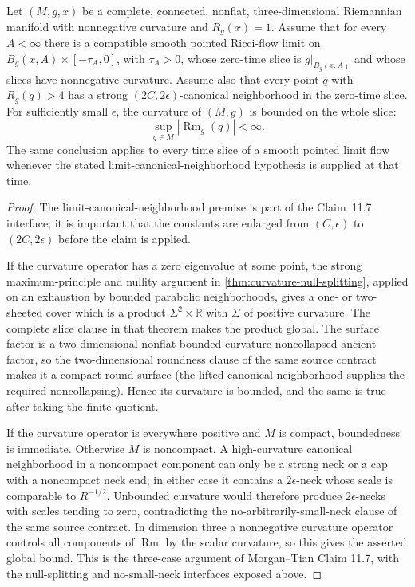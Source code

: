 \begin{lemma}
\label{lem:blowup-limit-slice-bounded-curvature}
\notready
Let $(M,g,x)$ be a complete, connected, nonflat, three-dimensional
Riemannian manifold with nonnegative curvature and $R_g(x)=1$.  Assume that
for every $A<\infty$ there is a compatible smooth pointed Ricci-flow limit on
$B_g(x,A)\times[-\tau_A,0]$, with $\tau_A>0$, whose zero-time slice is
$g|_{B_g(x,A)}$ and whose slices have nonnegative curvature.  Assume also
that every point $q$ with $R_g(q)>4$ has a strong $(2C,2\epsilon)$-canonical
neighborhood in the zero-time slice.  For sufficiently small $\epsilon$, the
curvature of $(M,g)$ is bounded on the whole slice:
\[
 \sup_{q\in M}|\operatorname{Rm}_g(q)|<\infty.
\]
The same conclusion applies to every time slice of a smooth pointed limit
flow whenever the stated limit-canonical-neighborhood hypothesis is supplied
at that time.
\end{lemma}

\begin{proof}
The limit-canonical-neighborhood premise is part of the Claim~11.7
interface; it is important that the constants are enlarged from
$(C,\epsilon)$ to $(2C,2\epsilon)$ before the claim is applied.

If the curvature operator has a zero eigenvalue at some point, the strong
maximum-principle and nullity argument in
\ref{thm:curvature-null-splitting}, applied on an exhaustion by bounded
parabolic neighborhoods, gives a one- or two-sheeted cover which is a product
$\Sigma^2\times\mathbb R$ with $\Sigma$ of positive curvature.  The complete
slice clause in that theorem makes the product global.  The surface factor is
a two-dimensional nonflat bounded-curvature noncollapsed ancient factor, so
the two-dimensional roundness clause of the same source contract makes it a
compact round surface (the lifted canonical neighborhood supplies the
required noncollapsing).  Hence its curvature is bounded, and the same is
true after taking the finite quotient.

If the curvature operator is everywhere positive and $M$ is compact, boundedness
is immediate.  Otherwise $M$ is noncompact.  A high-curvature canonical
neighborhood in a noncompact component can only be a strong neck or a cap with
a noncompact neck end; in either case it contains a $2\epsilon$-neck whose
scale is comparable to $R^{-1/2}$.  Unbounded curvature would therefore
produce $2\epsilon$-necks with scales tending to zero, contradicting the
no-arbitrarily-small-neck clause of the same source contract.  In dimension
three a
nonnegative curvature operator controls all components of $\operatorname{Rm}$
by the scalar curvature, so this gives the asserted global bound.
This is the three-case argument of Morgan--Tian Claim 11.7, with the
null-splitting and no-small-neck interfaces exposed above.
\end{proof}

